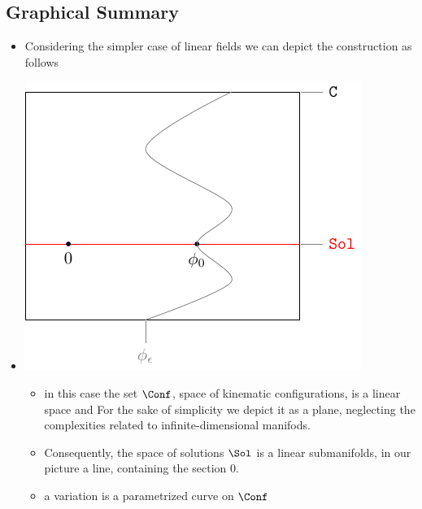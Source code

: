 \documentclass[a4paper,11pt]{scrartcl}
\begin{document}
	\subsection{Graphical Summary}
	\begin{itemize}
		\item Considering the simpler case of linear fields we can depict the construction as follows
		\item 
		\begin{minipage}{0.4\textwidth}
			\includegraphics[width=\textwidth]{../Pictures/GeometricPicture0}
		\end{minipage}
		\begin{minipage}{0.5\textwidth}
			\begin{itemize}
				\item in this case the set $\Conf$, space of kinematic configurations, is a linear space and 
					For the sake of simplicity we depict it as a plane, neglecting the complexities related to infinite-dimensional manifods.
				\item Consequently, the space of solutions $ \Sol$ is a linear submanifolds, in our picture a line, containing the section $0$.
				\item a variation is a parametrized curve on $\Conf$
			\end{itemize}
		\end{minipage}


\end{itemize}
\end{document}
